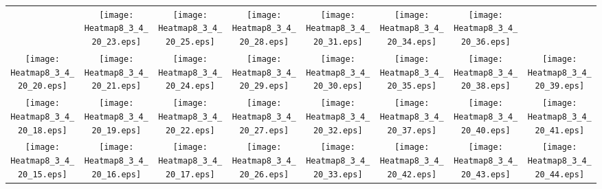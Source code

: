 \documentclass{standalone}
\begin{document}
\renewcommand{\arraystretch}{0}
\setlength{\tabcolsep}{0pt}
\begin{tabular}{ *8{c} }
 & \texttt{[image: Heatmap8\_3\_4\_20\_23.eps]} & \texttt{[image: Heatmap8\_3\_4\_20\_25.eps]} & \texttt{[image: Heatmap8\_3\_4\_20\_28.eps]} & \texttt{[image: Heatmap8\_3\_4\_20\_31.eps]} & \texttt{[image: Heatmap8\_3\_4\_20\_34.eps]} & \texttt{[image: Heatmap8\_3\_4\_20\_36.eps]} &  \\
\texttt{[image: Heatmap8\_3\_4\_20\_20.eps]} & \texttt{[image: Heatmap8\_3\_4\_20\_21.eps]} & \texttt{[image: Heatmap8\_3\_4\_20\_24.eps]} & \texttt{[image: Heatmap8\_3\_4\_20\_29.eps]} & \texttt{[image: Heatmap8\_3\_4\_20\_30.eps]} & \texttt{[image: Heatmap8\_3\_4\_20\_35.eps]} & \texttt{[image: Heatmap8\_3\_4\_20\_38.eps]} & \texttt{[image: Heatmap8\_3\_4\_20\_39.eps]} \\
\texttt{[image: Heatmap8\_3\_4\_20\_18.eps]} & \texttt{[image: Heatmap8\_3\_4\_20\_19.eps]} & \texttt{[image: Heatmap8\_3\_4\_20\_22.eps]} & \texttt{[image: Heatmap8\_3\_4\_20\_27.eps]} & \texttt{[image: Heatmap8\_3\_4\_20\_32.eps]} & \texttt{[image: Heatmap8\_3\_4\_20\_37.eps]} & \texttt{[image: Heatmap8\_3\_4\_20\_40.eps]} & \texttt{[image: Heatmap8\_3\_4\_20\_41.eps]} \\
\texttt{[image: Heatmap8\_3\_4\_20\_15.eps]} & \texttt{[image: Heatmap8\_3\_4\_20\_16.eps]} & \texttt{[image: Heatmap8\_3\_4\_20\_17.eps]} & \texttt{[image: Heatmap8\_3\_4\_20\_26.eps]} & \texttt{[image: Heatmap8\_3\_4\_20\_33.eps]} & \texttt{[image: Heatmap8\_3\_4\_20\_42.eps]} & \texttt{[image: Heatmap8\_3\_4\_20\_43.eps]} & \texttt{[image: Heatmap8\_3\_4\_20\_44.eps]} \\

\end{tabular}
\end{document}
